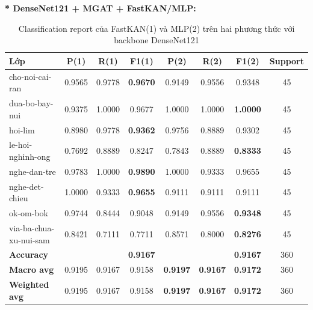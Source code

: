 \textbf{* DenseNet121 + MGAT + FastKAN/MLP:}
\begin{table}[H]
\centering
\renewcommand{\arraystretch}{1.08}
\caption{\centering Classification report của FastKAN(1) và MLP(2) trên hai phương thức với backbone DenseNet121}
\begin{tabular}{lccccccc}
\hline \textbf{Lớp} & \textbf{P(1)} & \textbf{R(1)} & \textbf{F1(1)} & \textbf{P(2)} & \textbf{R(2)} & \textbf{F1(2)} & \textbf{Support} \\ \hline

cho-noi-cai-ran
& 0.9565 & 0.9778 & \textbf{0.9670} 
& 0.9149 & 0.9556 & 0.9348 & 45 \\

dua-bo-bay-nui 
& 0.9375 & 1.0000 & 0.9677 
& 1.0000 & 1.0000 & \textbf{1.0000} & 45 \\

hoi-lim 
& 0.8980 & 0.9778 & \textbf{0.9362} 
& 0.9756 & 0.8889 & 0.9302 & 45 \\

le-hoi-nghinh-ong
& 0.7692 & 0.8889 & 0.8247 
& 0.7843 & 0.8889 & \textbf{0.8333} & 45 \\

nghe-dan-tre
& 0.9783 & 1.0000 & \textbf{0.9890} 
& 1.0000 & 0.9333 & 0.9655 & 45 \\

nghe-det-chieu 
& 1.0000 & 0.9333 & \textbf{0.9655} 
& 0.9111 & 0.9111 & 0.9111 & 45 \\

ok-om-bok
& 0.9744 & 0.8444 & 0.9048 
& 0.9149 & 0.9556 & \textbf{0.9348} & 45 \\

via-ba-chua-xu-nui-sam
& 0.8421 & 0.7111 & 0.7711 
& 0.8571 & 0.8000 & \textbf{0.8276} & 45 \\
\hline

\textbf{Accuracy}
& & & \textbf{0.9167}
& & & \textbf{0.9167} & 360 \\

\textbf{Macro avg} 
& 0.9195 & 0.9167 & 0.9158 
& \textbf{0.9197} & \textbf{0.9167} & \textbf{0.9172} & 360 \\

\textbf{Weighted avg}
& 0.9195 & 0.9167 & 0.9158 
& \textbf{0.9197} & \textbf{0.9167} & \textbf{0.9172} & 360 \\
\hline
\end{tabular}
\end{table}

